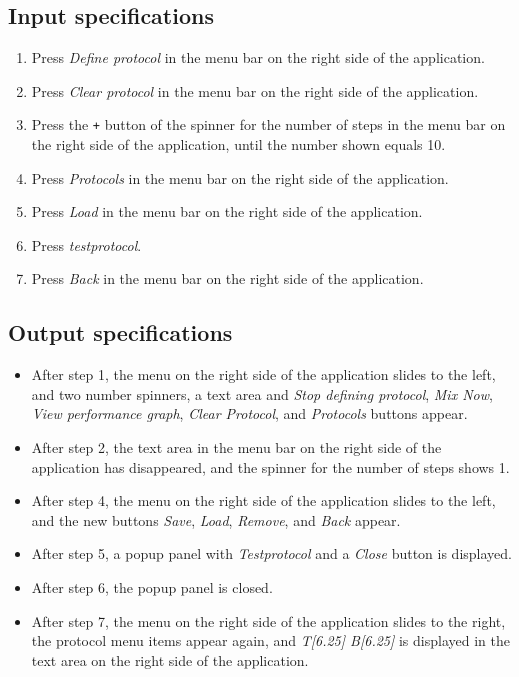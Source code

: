 \subsection*{Input specifications}
\begin{enumerate}
\item Press \emph{Define protocol} in the menu bar on the right side of the application.
\item Press \emph{Clear protocol} in the menu bar on the right side of the application.
\item Press the \texttt{+} button of the spinner for the number of steps in the menu bar on the right side of the application, until the number shown equals 10.
\item Press \emph{Protocols} in the menu bar on the right side of the application.
\item Press \emph{Load} in the menu bar on the right side of the application.
\item Press \emph{testprotocol}.
\item Press \emph{Back} in the menu bar on the right side of the application.
\end{enumerate}

\subsection*{Output specifications}
\begin{itemize}
\item After step 1, the menu on the right side of the application slides to the left, and two number spinners, a text area and \emph{Stop defining protocol}, \emph{Mix Now}, \emph{View performance graph}, \emph{Clear Protocol}, and \emph{Protocols} buttons appear.
\item After step 2, the text area in the menu bar on the right side of the application has disappeared, and the spinner for the number of steps shows 1.
\item After step 4, the menu on the right side of the application slides to the left, and the new buttons \emph{Save}, \emph{Load}, \emph{Remove}, and \emph{Back} appear.
\item After step 5, a popup panel with \emph{Testprotocol} and a \emph{Close} button is displayed.
\item After step 6, the popup panel is closed.
\item After step 7, the menu on the right side of the application slides to the right, the protocol menu items appear again, and \emph{T[6.25] B[6.25]} is displayed in the text area on the right side of the application.
\end{itemize}

